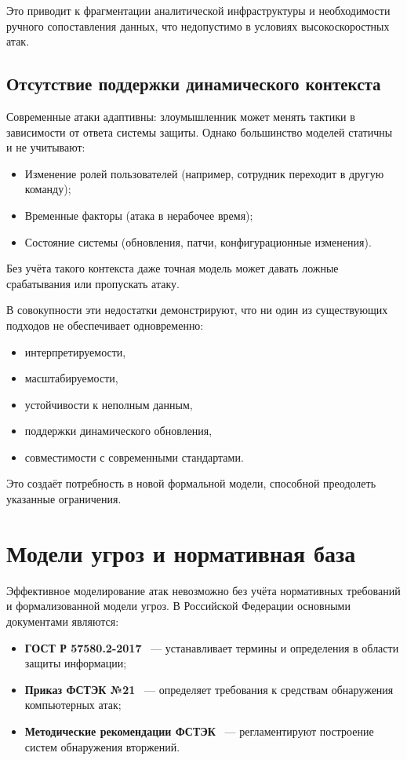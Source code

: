 \documentclass{article}
\begin{document}
Это приводит к фрагментации аналитической инфраструктуры и необходимости ручного сопоставления данных, что недопустимо в условиях высокоскоростных атак.

\subsection{Отсутствие поддержки динамического контекста}

Современные атаки адаптивны: злоумышленник может менять тактики в зависимости от ответа системы защиты. Однако большинство моделей статичны и не учитывают:

\begin{itemize}
    \item Изменение ролей пользователей (например, сотрудник переходит в другую команду);
    \item Временные факторы (атака в нерабочее время);
    \item Состояние системы (обновления, патчи, конфигурационные изменения).
\end{itemize}

Без учёта такого контекста даже точная модель может давать ложные срабатывания или пропускать атаку.

В совокупности эти недостатки демонстрируют, что ни один из существующих подходов не обеспечивает одновременно:
\begin{itemize}
    \item интерпретируемости,
    \item масштабируемости,
    \item устойчивости к неполным данным,
    \item поддержки динамического обновления,
    \item совместимости с современными стандартами.
\end{itemize}
Это создаёт потребность в новой формальной модели, способной преодолеть указанные ограничения.

\section{Модели угроз и нормативная база}\label{sec:ch1/sec4}

Эффективное моделирование атак невозможно без учёта нормативных требований и формализованной модели угроз. В Российской Федерации основными документами являются:

\begin{itemize}
    \item \textbf{ГОСТ Р 57580.2-2017}~\cite{GOSTR575802017} — устанавливает термины и определения в области защиты информации;
    \item \textbf{Приказ ФСТЭК №21}~\cite{FSTEKOrder21} — определяет требования к средствам обнаружения компьютерных атак;
    \item \textbf{Методические рекомендации ФСТЭК}~\cite{FSTEK2015} — регламентируют построение систем обнаружения вторжений.
\end{itemize}
\end{document}
